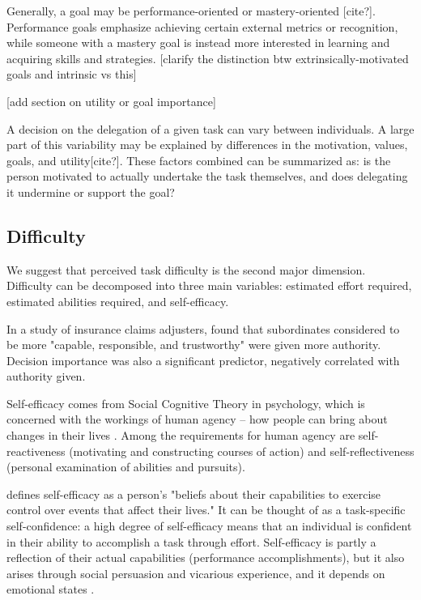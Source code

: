 \documentclass[letterpaper]{article} %
\begin{document}
Generally, a goal may be performance-oriented or mastery-oriented [cite?]. Performance goals emphasize achieving certain external metrics or recognition, while someone with a mastery goal is instead more interested in learning and acquiring skills and strategies. [clarify the distinction btw extrinsically-motivated goals and intrinsic vs this]

[add section on utility or goal importance] 

A decision on the delegation of a given task can vary between individuals. A large part of this variability may be explained by differences in the motivation, values, goals, and utility[cite?]. These factors combined can be summarized as: is the person motivated to actually undertake the task themselves, and does delegating it undermine or support the goal?

\subsection{Difficulty}
We suggest that perceived task difficulty is the second major dimension. Difficulty can be decomposed into three main variables: estimated effort required, estimated abilities required, and self-efficacy.

In a study of insurance claims adjusters, \cite{leana1986predictors} found that subordinates considered to be more "capable, responsible, and trustworthy" were given more authority. Decision importance was also a significant predictor, negatively correlated with authority given.


Self-efficacy comes from Social Cognitive Theory in psychology, which is concerned with the workings of human agency -- how people can bring about changes in their lives \cite{Bandura-agency}. Among the requirements for human agency are self-reactiveness (motivating and constructing courses of action) and self-reflectiveness (personal examination of abilities and pursuits). %

\cite{Bandura-89} defines self-efficacy as a person's "beliefs about their capabilities to exercise control over events that affect their lives." It can be thought of as a task-specific self-confidence: a high degree of self-efficacy means that an individual is confident in their ability to accomplish a task through effort. Self-efficacy  is partly a reflection of their actual capabilities (performance accomplishments), but it also arises through social persuasion and vicarious experience, and it depends on emotional states \cite{Bandura-89}.
\end{document}

